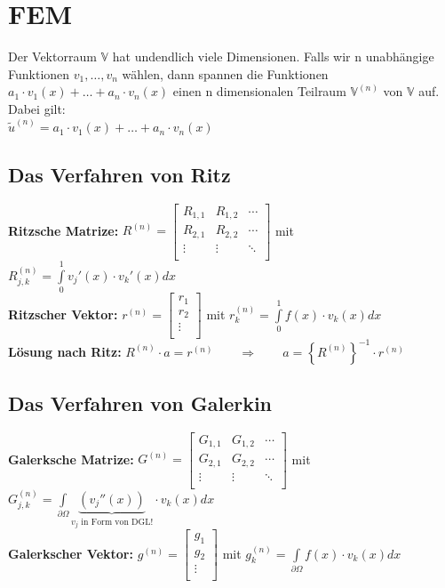 \section{FEM}

Der Vektorraum $\mathbb{V}$ hat undendlich viele Dimensionen. Falls wir n unabhängige Funktionen $v_1,\ldots,v_n$ wählen, dann spannen die Funktionen $a_1\cdot v_1(x)+\ldots+a_n\cdot v_n(x)$ einen n dimensionalen Teilraum $\mathbb{V}^{(n)}$  von $\mathbb{V}$ auf. Dabei gilt:\\

$\boxed{\tilde{u}^{(n)}=a_1\cdot v_1(x)+\ldots+a_n\cdot v_n(x)}$
\subsection{Das Verfahren von Ritz}
\textbf{Ritzsche Matrize: }
$R^{(n)}=\begin{bmatrix}
	R_{1,1}& R_{1,2}&\cdots\\
	R_{2,1}& R_{2,2}&\cdots\\
	\vdots & \vdots &\ddots\\
\end{bmatrix}$ \qquad mit \qquad $R_{j,k}^{(n)}=\int\limits_{0}^{1}{v_j'(x)\cdot
v_k'(x) dx}$\\
\textbf{Ritzscher Vektor: } 
$r^{(n)}=\begin{bmatrix}
	r_1\\
	r_2\\
	\vdots\\
\end{bmatrix}$ \qquad mit \qquad $r_{k}^{(n)}=\int\limits_{0}^{1}{f(x)\cdot v_k(x) dx}$\\

\textbf{Lösung nach Ritz:} $R^{(n)}\cdot a=r^{(n)}\qquad \Rightarrow \qquad a=\left\{R^{(n)}\right\}^{-1}\cdot r^{(n)}$
\subsection{Das Verfahren von Galerkin}
\textbf{Galerksche Matrize: }
$G^{(n)}=\begin{bmatrix}
	G_{1,1}& G_{1,2}&\cdots\\
	G_{2,1}& G_{2,2}&\cdots\\
	\vdots & \vdots &\ddots\\
\end{bmatrix}$ \qquad mit \qquad $G_{j,k}^{(n)}=\int\limits_{\partial \Omega}{\underbrace{(v_j''(x))}_{v_j \text{ in Form von DGL!}}\cdot v_k(x) dx}$\\
\textbf{Galerkscher Vektor: } 
$g^{(n)}=\begin{bmatrix}
	g_1\\
	g_2\\
	\vdots\\
\end{bmatrix}$ \qquad mit \qquad $g_{k}^{(n)}=\int\limits_{\partial \Omega}{f(x)\cdot v_k(x) dx}$\\

